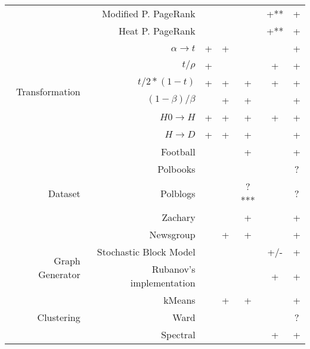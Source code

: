 \documentclass{article}
\begin{document}
\begin{table}[H]
\begin{tabular}{rr|cccc|c}
                & Modified P. PageRank     &            &          &        & +**         & \cellcolor{yellow!25} + \\
                & Heat P. PageRank         &            &          &        & +**         & \cellcolor{yellow!25} + \\
                \hline
\multirow{6}{*}{Transformation} & $\alpha \rightarrow t$ & + & +   &        &             & +      \\
                & $t / \rho$               & +          &          &        & +           & +      \\
                & $t / 2*(1 - t)$          & +          & +        & +      & +           & +      \\
                & $(1 - \beta) / \beta$    &            & +        & +      &             & +      \\
                & $H0 \rightarrow H$       & +          & +        & +      & +           & +      \\
                & $H \rightarrow D$        & +          & +        & +      &             & +      \\
                \hline
\multirow{5}{*}{Dataset} & Football        &            &          & +      &             & +      \\
                & Polbooks                 &            &          &        &             & \cellcolor{yellow!25} ? \\
                & Polblogs                 &            &          & ?***   &             & \cellcolor{yellow!25} ? \\
                & Zachary                  &            &          & +      &             & +      \\
                & Newsgroup                &            & +        & +      &             & +      \\
                \hline
\multirow{2}{*}{Graph Generator} & Stochastic Block Model &  &     &        & \cellcolor{yellow!25} +/- & \cellcolor{yellow!25} + \\
                & Rubanov's implementation &            &          &        & +           & +      \\
                \hline
\multirow{3}{*}{Clustering} & kMeans       &            & +        & +      &             & +      \\
                & Ward                     &            &          &        &             & \cellcolor{yellow!25} ? \\
                & Spectral                 &            &          &        & +           & +
\end{tabular}
\end{table}
\end{document}
